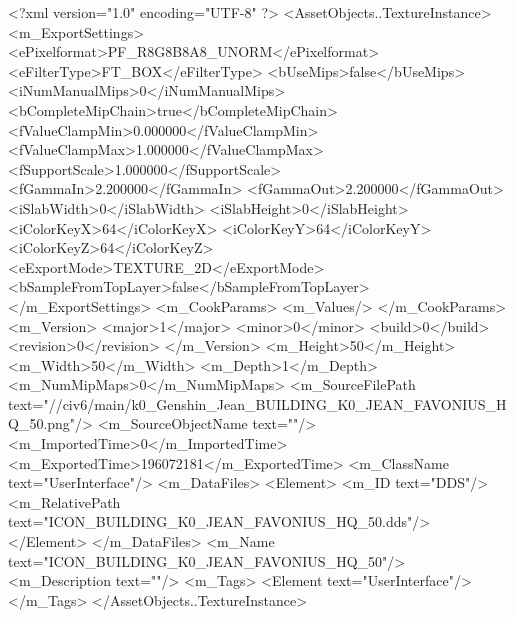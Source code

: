 <?xml version="1.0" encoding="UTF-8" ?>
<AssetObjects..TextureInstance>
	<m_ExportSettings>
		<ePixelformat>PF_R8G8B8A8_UNORM</ePixelformat>
		<eFilterType>FT_BOX</eFilterType>
		<bUseMips>false</bUseMips>
		<iNumManualMips>0</iNumManualMips>
		<bCompleteMipChain>true</bCompleteMipChain>
		<fValueClampMin>0.000000</fValueClampMin>
		<fValueClampMax>1.000000</fValueClampMax>
		<fSupportScale>1.000000</fSupportScale>
		<fGammaIn>2.200000</fGammaIn>
		<fGammaOut>2.200000</fGammaOut>
		<iSlabWidth>0</iSlabWidth>
		<iSlabHeight>0</iSlabHeight>
		<iColorKeyX>64</iColorKeyX>
		<iColorKeyY>64</iColorKeyY>
		<iColorKeyZ>64</iColorKeyZ>
		<eExportMode>TEXTURE_2D</eExportMode>
		<bSampleFromTopLayer>false</bSampleFromTopLayer>
	</m_ExportSettings>
	<m_CookParams>
		<m_Values/>
	</m_CookParams>
	<m_Version>
		<major>1</major>
		<minor>0</minor>
		<build>0</build>
		<revision>0</revision>
	</m_Version>
	<m_Height>50</m_Height>
	<m_Width>50</m_Width>
	<m_Depth>1</m_Depth>
	<m_NumMipMaps>0</m_NumMipMaps>
	<m_SourceFilePath text="//civ6/main/k0_Genshin_Jean\Textures\ICON_BUILDING_K0_JEAN_FAVONIUS_HQ_50.png"/>
	<m_SourceObjectName text=""/>
	<m_ImportedTime>0</m_ImportedTime>
	<m_ExportedTime>196072181</m_ExportedTime>
	<m_ClassName text="UserInterface"/>
	<m_DataFiles>
		<Element>
			<m_ID text="DDS"/>
			<m_RelativePath text="ICON_BUILDING_K0_JEAN_FAVONIUS_HQ_50.dds"/>
		</Element>
	</m_DataFiles>
	<m_Name text="ICON_BUILDING_K0_JEAN_FAVONIUS_HQ_50"/>
	<m_Description text=""/>
	<m_Tags>
		<Element text="UserInterface"/>
	</m_Tags>
</AssetObjects..TextureInstance>

